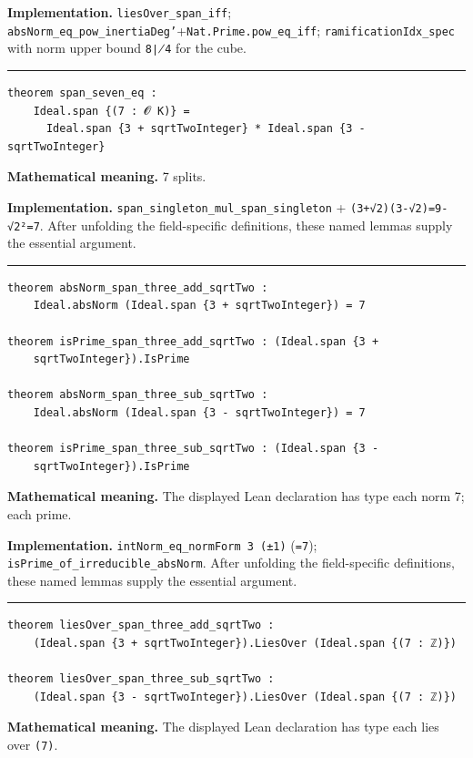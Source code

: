 \documentclass[UTF8,a4paper,11pt,fontset=fandol]{ctexart}
\theoremstyle{definition}
\newcommand{\statementsep}{\par\medskip\hrule\medskip}
\begin{document}
\noindent\textbf{Implementation.} \texttt{liesOver\_\allowbreak{}span\_\allowbreak{}iff}; \texttt{absNorm\_\allowbreak{}eq\_\allowbreak{}pow\_\allowbreak{}inertiaDeg'}+\texttt{Nat.\allowbreak{}Prime.\allowbreak{}pow\_\allowbreak{}eq\_\allowbreak{}iff}; \texttt{ramificationIdx\_\allowbreak{}spec} with norm upper bound \texttt{8∤4} for the cube.\par
\statementsep
\begin{verbatim}
theorem span_seven_eq :
    Ideal.span {(7 : 𝓞 K)} =
      Ideal.span {3 + sqrtTwoInteger} * Ideal.span {3 - sqrtTwoInteger}
\end{verbatim}
\noindent\textbf{Mathematical meaning.} 7 splits.\par
\noindent\textbf{Implementation.} \texttt{span\_\allowbreak{}singleton\_\allowbreak{}mul\_\allowbreak{}span\_\allowbreak{}singleton} + \texttt{(3+√2)(3-√2)=9-√2²=7}. After unfolding the field-specific definitions, these named lemmas supply the essential argument.\par
\statementsep
\begin{verbatim}
theorem absNorm_span_three_add_sqrtTwo :
    Ideal.absNorm (Ideal.span {3 + sqrtTwoInteger}) = 7

theorem isPrime_span_three_add_sqrtTwo : (Ideal.span {3 +
    sqrtTwoInteger}).IsPrime

theorem absNorm_span_three_sub_sqrtTwo :
    Ideal.absNorm (Ideal.span {3 - sqrtTwoInteger}) = 7

theorem isPrime_span_three_sub_sqrtTwo : (Ideal.span {3 -
    sqrtTwoInteger}).IsPrime
\end{verbatim}
\noindent\textbf{Mathematical meaning.} The displayed Lean declaration has type each norm 7; each prime.\par
\noindent\textbf{Implementation.} \texttt{intNorm\_\allowbreak{}eq\_\allowbreak{}normForm 3 (±1)} (\texttt{=7}); \texttt{isPrime\_\allowbreak{}of\_\allowbreak{}irreducible\_\allowbreak{}absNorm}. After unfolding the field-specific definitions, these named lemmas supply the essential argument.\par
\statementsep
\begin{verbatim}
theorem liesOver_span_three_add_sqrtTwo :
    (Ideal.span {3 + sqrtTwoInteger}).LiesOver (Ideal.span {(7 : ℤ)})

theorem liesOver_span_three_sub_sqrtTwo :
    (Ideal.span {3 - sqrtTwoInteger}).LiesOver (Ideal.span {(7 : ℤ)})
\end{verbatim}
\noindent\textbf{Mathematical meaning.} The displayed Lean declaration has type each lies over \texttt{(7)}.\par
\end{document}
